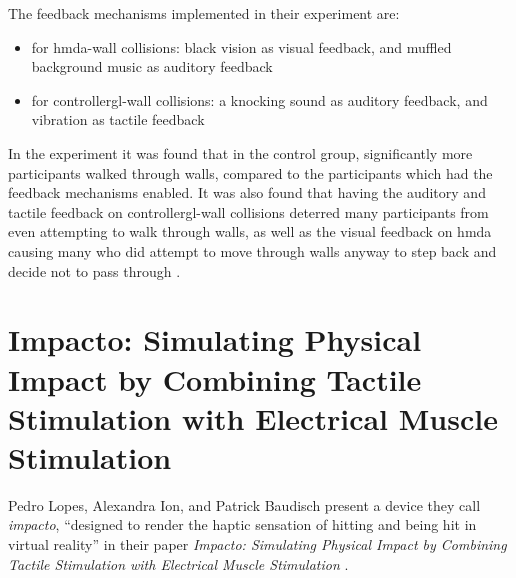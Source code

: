 The feedback mechanisms implemented in their experiment are:
\begin{itemize}
    \item for \gls{hmda}-wall collisions: black vision as visual feedback, and  muffled background music as auditory feedback
    \item for \gls{controllergl}-wall collisions: a knocking sound as auditory feedback, and vibration as tactile feedback
\end{itemize}
In the experiment it was found that in the control group, significantly more participants walked through walls, compared to the participants which had the feedback mechanisms enabled. It was also found that having the auditory and tactile feedback on \gls{controllergl}-wall collisions deterred many participants from even attempting to walk through walls, as well as the visual feedback on \gls{hmda} causing many who did attempt to move through walls anyway to step back and decide not to pass through \autocite[p. ~6,7]{nonIntrusiveFeedback}.



\section{Impacto: Simulating Physical Impact by Combining
Tactile Stimulation with Electrical Muscle Stimulation} \label{section:impacto}

Pedro Lopes, Alexandra Ion, and Patrick Baudisch present a device they call \textit{impacto}, \enquote{designed to render the haptic
sensation of hitting and being hit in virtual reality} \autocite[p. ~1]{impacto} in their paper \textit{Impacto: Simulating Physical Impact by Combining Tactile Stimulation with Electrical Muscle Stimulation} \autocite{impacto}.
\newline

